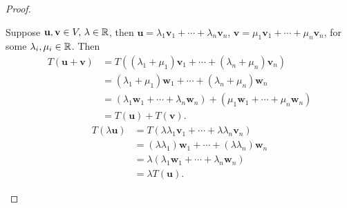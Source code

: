 \documentclass[10pt, a4paper]{article}
\newcommand{\mbf}[1]{\mathbf{#1}}
\begin{document}
\begin{lemma}
\begin{proof}
\begin{enumerate}[label = (\roman*)]
            Suppose $\mbf{u, v} \in V,\, \lambda \in \R$,
            then $\mbf{u} = \lambda_1\mbf{v}_1 + \dotsi + \lambda_n\mbf{v}_n$,
            $\mbf{v} = \mu_1\mbf{v}_1 + \dotsi + \mu_n\mbf{v}_n$,
            for some $\lambda_i, \mu_i \in \mathbb{R}$.
            Then
            \begin{align*}
                T(\mbf{u + v}) &= T((\lambda_1 + \mu_1)\mbf{v}_1 + \dotsi + (\lambda_n + \mu_n)\mbf{v}_n) \\
                &= (\lambda_1 + \mu_1)\mbf{w}_1 + \dotsi + (\lambda_n + \mu_n)\mbf{w}_n \\
                &= (\lambda_1\mbf{w}_1 + \dotsi + \lambda_n\mbf{w}_n) + (\mu_1\mbf{w}_1 + \dotsi + \mu_n\mbf{w}_n) \\
                &= T(\mbf{u}) + T(\mbf{v}).
            \end{align*}
            \begin{align*}
                T(\lambda\mbf{u}) &= T(\lambda\lambda_1\mbf{v}_1 + \dotsi + \lambda\lambda_n\mbf{v}_n) \\
                &= (\lambda\lambda_1)\mbf{w}_1 + \dotsi + (\lambda\lambda_n)\mbf{w}_n \\
                &= \lambda(\lambda_1\mbf{w}_1 + \dotsi + \lambda_n\mbf{w}_n) \\
                &= \lambda T(\mbf{u}).
            \end{align*}
        \end{enumerate}
    \end{proof}
\end{lemma}
\end{document}

